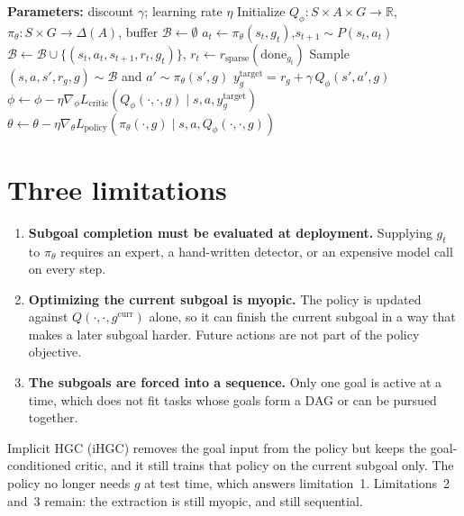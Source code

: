 \documentclass[11pt]{article}
\newcommand{\R}{\mathbb{R}}
\begin{document}
\begin{algorithm}[t]
\caption{Hierarchical goal conditioning RL (HGC-RL)}
\label{alg:hgc}
\begin{algorithmic}[1]
\State \textbf{Parameters:} discount $\gamma$; learning rate $\eta$
\State Initialize $Q_\phi:S\times A\times G\to\R$,\;
       $\pi_\theta:S\times G\to\Delta(A)$,\;
       buffer $\mathcal{B}\leftarrow\emptyset$
    \State $a_t\leftarrow\pi_\theta(s_t,g_t)$,\quad $s_{t+1}\sim P(s_t,a_t)$
    \State $\mathcal{B}\leftarrow\mathcal{B}\cup\{(s_t,a_t,s_{t+1},r_t,g_t)\}$,\quad
           $r_t\leftarrow r_{\mathrm{sparse}}(\mathrm{done}_{g_t})$
      \State Sample $(s,a,s',r_g,g)\sim\mathcal{B}$ and $a'\sim\pi_\theta(s',g)$
      \State $y^{\mathrm{target}}_g = r_g + \gamma\, Q_\phi(s',a',g)$
      \State $\phi\leftarrow\phi-\eta\nabla_\phi L_{\mathrm{critic}}\!\left(Q_\phi(\cdot,\cdot,g)\mid s,a,y^{\mathrm{target}}_g\right)$
      \State $\theta\leftarrow\theta-\eta\nabla_\theta L_{\mathrm{policy}}\!\left(\pi_\theta(\cdot,g)\mid s,a,Q_\phi(\cdot,\cdot,g)\right)$
    \EndFor
  \EndWhile
\EndFor
\end{algorithmic}
\end{algorithm}

\section{Three limitations}
\begin{enumerate}[leftmargin=1.4em,itemsep=0.4em]
  \item \textbf{Subgoal completion must be evaluated at deployment.}
        Supplying $g_t$ to $\pi_\theta$ requires an expert, a hand-written detector, or an expensive model call on every step.
  \item \textbf{Optimizing the current subgoal is myopic.}
        The policy is updated against $Q(\cdot,\cdot,g^{\mathrm{curr}})$ alone, so it can finish the current subgoal in a way that makes a later subgoal harder.
        Future actions are not part of the policy objective.
  \item \textbf{The subgoals are forced into a sequence.}
        Only one goal is active at a time, which does not fit tasks whose goals form a DAG or can be pursued together.
\end{enumerate}

Implicit HGC (iHGC) removes the goal input from the policy but keeps the goal-conditioned critic, and it still trains that policy on the current subgoal only.
The policy no longer needs $g$ at test time, which answers limitation~1.
Limitations~2 and~3 remain: the extraction is still myopic, and still sequential.
\end{document}
